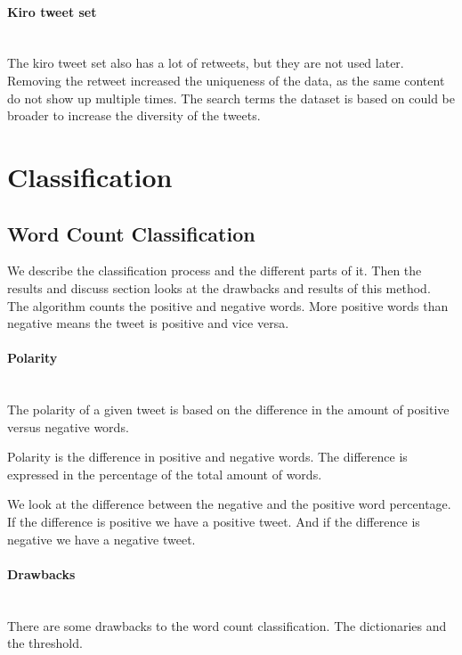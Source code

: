 \paragraph{Kiro tweet set}
\hspace{0pt}\\
The kiro tweet set also has a lot of retweets, but they are not used later.
Removing the retweet increased the uniqueness of the data, as the same content
do not show up multiple times. The search terms the dataset is based on
could be broader to increase the diversity of the tweets.
%

\section{Classification}\label{sentiment:classification}
\subsection{Word Count Classification}\label{sentiment:word_count_classification}
We describe the classification process and the different parts of it. Then the
results and discuss section looks at the drawbacks and results of this method.
The algorithm counts the positive and negative words. More positive words than
negative means the tweet is positive and vice versa. 

\paragraph{Polarity} 
\hspace{0pt}\\ 
The polarity of a given tweet is based on the difference in the amount of
positive versus negative words. 

Polarity is the difference in positive and negative words. The difference is
expressed in the percentage of the total amount of words.  

We look at the difference between the negative and the positive word
percentage. If the difference is positive we have a positive tweet. And if the
difference is negative we have a negative tweet.

\paragraph{Drawbacks}
\hspace{0pt}\\
There are some drawbacks to the word count classification. The dictionaries
and the threshold. 

